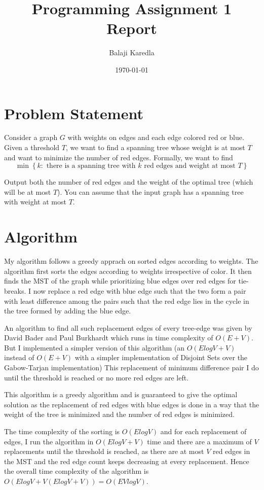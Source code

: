 \documentclass{article}
\author{Balaji Karedla}
\title{Programming Assignment 1 \\ Report}
\date{\today}
\begin{document}


\maketitle

\section{Problem Statement}

Consider a graph $G$ with weights on edges and each edge colored red or blue.
Given a threshold $T$, we want to ﬁnd a spanning tree whose weight is at most $T$ and want to minimize the
number of red edges. Formally, we want to ﬁnd
\[
    \min \left\{ k: \text{ there is a spanning tree with } k \text{ red edges and weight at most } T \right\}
\]
    
Output both the number of red edges and the weight of the optimal tree (which will be at most $T$). You
can assume that the input graph has a spanning tree with weight at most $T$.

\section{Algorithm}

My algorithm follows a greedy apprach on sorted edges according to weights. The algorithm first sorts the edges according to weights irrespective of color. It then finds the MST of the graph while prioritizing blue edges over red edges for tie-breaks. I now replace a red edge with blue edge such that the two form a pair with least difference among the pairs such that the red edge lies in the cycle in the tree formed by adding the blue edge. 

An algorithm to find all such replacement edges of every tree-edge was given by David Bader and Paul Burkhardt which runs in time complexity of $O(E+V)$\cite{Bader_2022}. But I implemented a simpler version of this algorithm (an $O(ElogV + V)$ instead of $O(E+V)$ with a simpler implementation of Disjoint Sets over the Gabow-Tarjan implementation) This replacement of minimum difference pair I do until the threshold is reached or no more red edges are left.

This algorithm is a greedy algorithm and is guaranteed to give the optimal solution as the replacement of red edges with blue edges is done in a way that the weight of the tree is minimized and the number of red edges is minimized.

The time complexity of the sorting is $O(ElogV)$ and for each replacement of edges, I run the algorithm in $O(ElogV+V)$ time and there are a maximum of $V$ replacements until the threshold is reached, as there are at most $V$ red edges in the MST and the red edge count keeps decreasing at every replacement. Hence the overall time complexity of the algorithm is $O(ElogV + V(ElogV+V)) = O(EVlogV)$.


\end{document}
